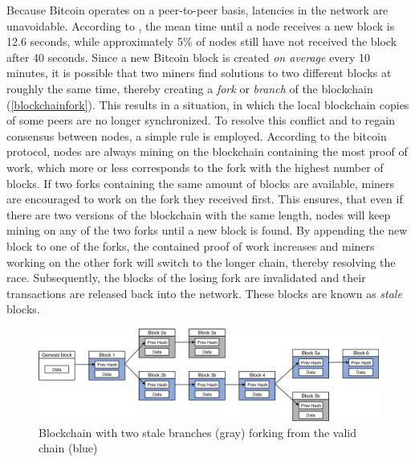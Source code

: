 \documentclass[a4paper,12pt,twoside]{report}
\begin{document}
Because Bitcoin operates on a peer-to-peer basis, latencies in the network are unavoidable. According to \cite{infoprop}, the mean time until a
node receives a new block is 12.6 seconds, while approximately 5\% of nodes still have not received the block after 40 seconds. Since a new Bitcoin block is created \textit{on average} every 10 minutes, it is possible that two miners find solutions to two different blocks at roughly the same time, thereby creating a \textit{fork} or \textit{branch} of the blockchain (\autoref{blockchainfork}). This results in a situation, in which the local blockchain copies of some peers are no longer synchronized. To resolve this conflict and to regain consensus between nodes, a simple rule is employed. According to the bitcoin protocol, nodes are always mining on the blockchain containing the most proof of work, which more or less corresponds to the fork with the highest number of blocks. If two forks containing the same amount of blocks are available, miners are encouraged to work on the fork they received first. This ensures, that even if there are two versions of the blockchain with the same length, nodes will keep mining on any of the two forks until a new block is found. By appending the new block to one of the forks, the contained proof of work increases and miners working on the other fork will switch to the longer chain, thereby resolving the race. Subsequently, the blocks of the losing fork are invalidated and their transactions are released back into the network. These blocks are known as \textit{stale} blocks. \cite{okupski2014bitcoin}
\begin{figure}[ht]
	\centering
  \includegraphics[width=\textwidth]{BlockchainFork.png}
	\caption{Blockchain with two stale branches (gray) forking from the valid chain (blue) }
	\label{blockchainfork}
\end{figure}
\end{document}
